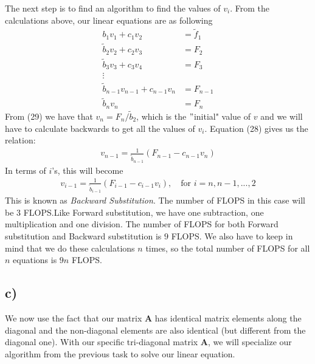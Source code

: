 \documentclass[12pt]{article}
\begin{document}
The next step is to find an algorithm to find the values of $v_i$. From the calculations above, our linear equations are as following
\begin{align}
b_1v_1 + c_1v_2 &= \tilde{f}_1 \\
\tilde{b}_2v_2 + c_2v_3 &= F_2 \\
\tilde{b}_3v_3 + c_3v_4 &= F_3 \\
\vdots \nonumber \\
\tilde{b}_{n-1} v_{n-1} + c_{n-1}v_n &= F_{n-1} \\
\tilde{b}_nv_n &= F_n
\end{align}
From (29) we have that $v_n = F_n/\tilde{b}_2$, which is the $"$initial" value of $v$ and we will have to calculate backwards to get all the values of $v_i$. Equation (28) gives us the relation:
\begin{align*}
v_{n-1} = \frac{1}{\tilde{b}_{n-1}}\left(F_{n-1}-c_{n-1}v_n \right)
\end{align*}
In terms of $i$'s, this will become
\begin{align}
v_{i-1} = \frac{1}{\tilde{b}_{i-1}}\left(F_{i-1} - c_{i-1}v_i \right), \quad \text{for } i = n,n-1,...,2
\end{align}
This is known as \textit{Backward Substitution}. The number of FLOPS in this case will be $3$ FLOPS.Like Forward substitution, we have one subtraction, one multiplication and one division. The number of FLOPS for both Forward substitution and Backward substitution is $9$ FLOPS. We also have to keep in mind that we do these calculations $n$ times, so the total number of FLOPS for all $n$ equations is $9n$ FLOPS.
\subsection*{c)}
We now use the fact that our matrix $\mathbf{A}$ has identical matrix elements along the diagonal and the non-diagonal elements are also identical (but different from the diagonal one). With our specific tri-diagonal matrix $\mathbf{A}$, we will specialize our algorithm from the previous task to solve our linear equation.
\end{document}
